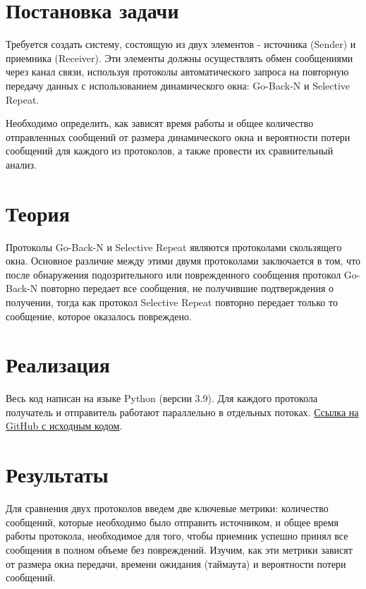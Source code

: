\documentclass[a4paper,12pt]{article}
\begin{document}
    
    \newpage

    \tableofcontents
    \newpage

    \section{Постановка задачи}
    \quad Требуется создать систему, состоящую из двух элементов - источника (Sender) и приемника (Receiver).
    Эти элементы должны осуществлять обмен сообщениями через канал связи, используя протоколы автоматического запроса на повторную передачу данных с использованием динамического окна: Go-Back-N и Selective Repeat.

    Необходимо определить, как зависят время работы и общее количество отправленных сообщений от размера динамического окна и вероятности потери сообщений для каждого из протоколов, а также провести их сравнительный анализ.

    \section{Теория} \label{s:theory}
    \quad Протоколы Go-Back-N и Selective Repeat являются протоколами скользящего окна.
    Основное различие между этими двумя протоколами заключается в том, что после обнаружения подозрительного или поврежденного сообщения
    протокол Go-Back-N повторно передает все сообщения, не получившие подтверждения о получении,
    тогда как протокол Selective Repeat повторно передает только то сообщение, которое оказалось повреждено.

    \section{Реализация}
    \quad Весь код написан на языке Python (версии 3.9).
    Для каждого протокола получатель и отправитель работают параллельно в отдельных потоках.
    \href{https://github.com/gobdr/Networks/tree/master/1_lab}{Ссылка на GitHub с исходным кодом}.

    \section{Результаты}
    \quad Для сравнения двух протоколов введем две ключевые метрики: количество сообщений, которые необходимо было отправить источником, и общее время работы протокола, необходимое для того, чтобы приемник успешно принял все сообщения в полном объеме без повреждений.
    Изучим, как эти метрики зависят от размера окна передачи, времени ожидания (таймаута) и вероятности потери сообщений.
\end{document}
